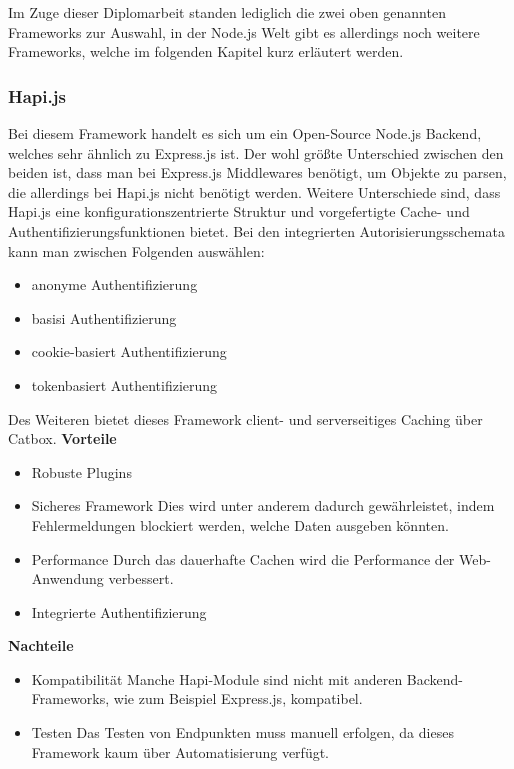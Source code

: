 Im Zuge dieser Diplomarbeit standen lediglich die zwei oben genannten Frameworks zur Auswahl, in der Node.js Welt gibt es allerdings noch weitere Frameworks, welche im folgenden Kapitel kurz erläutert werden.

\subsubsection{Hapi.js}
Bei diesem Framework handelt es sich um ein Open-Source Node.js Backend, welches sehr ähnlich zu Express.js ist. Der wohl größte Unterschied zwischen den beiden ist, dass man bei Express.js Middlewares benötigt, um Objekte zu parsen, die allerdings bei Hapi.js nicht benötigt werden. Weitere Unterschiede sind, dass Hapi.js eine konfigurationszentrierte Struktur und vorgefertigte Cache- und Authentifizierungsfunktionen bietet. Bei den integrierten Autorisierungsschemata kann man zwischen Folgenden auswählen:
\begin{itemize}
    \item anonyme Authentifizierung
    \item basisi Authentifizierung
    \item cookie-basiert Authentifizierung
    \item tokenbasiert Authentifizierung
\end{itemize}
Des Weiteren bietet dieses Framework client- und serverseitiges Caching über Catbox.
\newline
\textbf{Vorteile}
\begin{itemize}
    \item Robuste Plugins
    \item Sicheres Framework
        \newline
        Dies wird unter anderem dadurch gewährleistet, indem Fehlermeldungen blockiert werden, welche Daten ausgeben könnten.
    \item Performance
        \newline
        Durch das dauerhafte Cachen wird die Performance der Web-Anwendung verbessert.
    \item Integrierte Authentifizierung
\end{itemize}
\newpage
\textbf{Nachteile}
\begin{itemize}
    \item Kompatibilität
        \newline
        Manche Hapi-Module sind nicht mit anderen Backend-Frameworks, wie zum Beispiel Express.js, kompatibel.
    \item Testen
        \newline
        Das Testen von Endpunkten muss manuell erfolgen, da dieses Framework kaum über Automatisierung verfügt.
\end{itemize}
\cite{backend_hapi}

